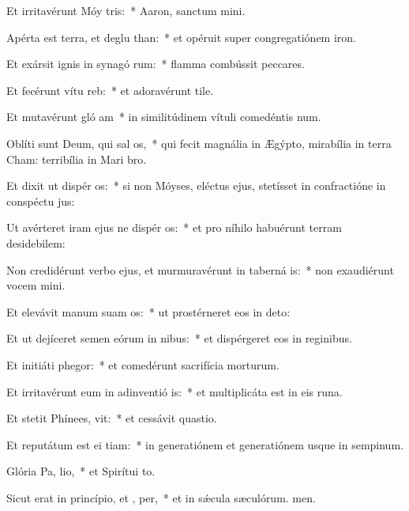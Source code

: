 \item Et irritavérunt Móy  tris:~* Aaron, sanctum mini.
\item Apérta est terra, et deglu than:~* et opéruit super congregatiónem iron.
\item Et exársit ignis in synagó rum:~* flamma combússit peccares.
\item Et fecérunt vítu  reb:~* et adoravérunt tile.
\item Et mutavérunt gló am~* in similitúdinem vítuli comedéntis num.
\item Oblíti sunt Deum, qui sal os,~* qui fecit magnália in Ægýpto, mirabília in terra Cham: terribília in Mari bro.
\item Et dixit ut dispér os:~* si non Móyses, eléctus ejus, stetísset in confractióne in conspéctu jus:
\item Ut avérteret iram ejus ne dispér os:~* et pro níhilo habuérunt terram desidebilem:
\item Non credidérunt verbo ejus, et murmuravérunt in taberná is:~* non exaudiérunt vocem mini.
\item Et elevávit manum suam  os:~* ut prostérneret eos in deto:
\item Et ut dejíceret semen eórum in nibus:~* et dispérgeret eos in reginibus.
\item Et initiáti  phegor:~* et comedérunt sacrifícia morturum.
\item Et irritavérunt eum in adinventió is:~* et multiplicáta est in eis runa.
\item Et stetit Phínees,  vit:~* et cessávit quastio.
\item Et reputátum est ei  tiam:~* in generatiónem et generatiónem usque in sempinum.
\item Glória Pa,  lio,~* et Spirítui to.
\item Sicut erat in princípio, et ,  per,~* et in sǽcula sæculórum. men.
